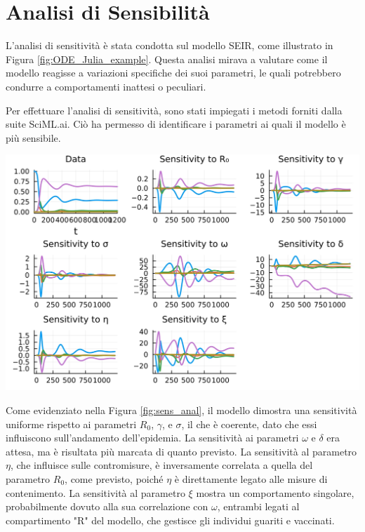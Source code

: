 \section{Analisi di Sensibilità}

L'analisi di sensitività è stata condotta sul modello SEIR, 
come illustrato in Figura \ref{fig:ODE_Julia_example}. 
Questa analisi mirava a valutare come il modello reagisse a 
variazioni specifiche dei suoi parametri, le quali potrebbero 
condurre a comportamenti inattesi o peculiari.

Per effettuare l'analisi di sensitività, sono stati impiegati i 
metodi forniti dalla suite SciML.ai. Ciò ha permesso di identificare 
i parametri ai quali il modello è più sensibile.

\begin{minipage}{\linewidth}
	\centering
	\includegraphics[width=\textwidth]{img/sa.jpg}
	\label{fig:sens_anal}
\end{minipage}

Come evidenziato nella Figura \ref{fig:sens_anal}, il modello 
dimostra una sensitività uniforme rispetto ai parametri 
$R_0$, $\gamma$, e $\sigma$, il che è coerente, dato che essi 
influiscono sull'andamento dell'epidemia. La sensitività ai parametri 
$\omega$ e $\delta$ era attesa, ma è risultata più marcata di 
quanto previsto. La sensitività al parametro $\eta$, che influisce 
sulle contromisure, è inversamente correlata a quella del 
parametro $R_0$, come previsto, poiché $\eta$ è direttamente 
legato alle misure di contenimento. La sensitività al parametro 
$\xi$ mostra un comportamento singolare, probabilmente dovuto 
alla sua correlazione con $\omega$, entrambi legati al compartimento 
"R" del modello, che gestisce gli individui guariti e vaccinati.

